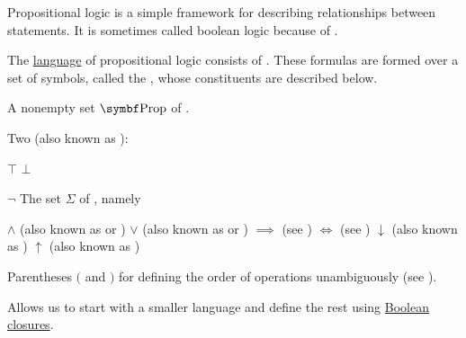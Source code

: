 \begin{definition}\label{def:propositional_language}\cite[102]{OpenLogic20201202}
  Propositional logic is a simple framework for describing relationships between statements. It is sometimes called boolean logic because of .

  The \hyperref[def:language]{language} of propositional logic consists of . These formulas are formed over a set of symbols, called the , whose constituents are described below.

  \begin{defenum}
     A nonempty set \( \Bold{Prop} \) of .

     Two  (also known as ):
    \begin{defenum}
       \( \top \)
       \( \bot \)
    \end{defenum}

     \( \neg \)
     The set \( \Sigma \) of , namely
    \begin{defenum}
        \( \wedge \) (also known as  or \hyperref[def:lattice_operations]{})
       \( \vee \) (also known as  or \hyperref[def:lattice_operations]{})
        \( \implies \) (see )
        \( \iff \) (see )
        \( \downarrow \) (also known as )
        \( \uparrow \) (also known as )
    \end{defenum}

     Parentheses \( ( \) and \( ) \) for defining the order of operations unambiguously (see ).
  \end{defenum}

   Allows us to start with a smaller language and define the rest using \hyperref[def:boolean_closure]{Boolean closures}.
\end{definition}

